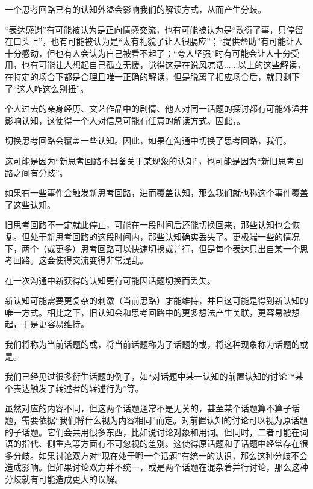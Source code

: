 一个思考回路已有的认知外溢会影响我们的解读方式，从而产生分歧。
\begin{explain}
“表达感谢”有可能被认为是正向情感交流，也有可能被认为是“敷衍了事，只停留在口头上”，也有可能被认为是“太有礼貌了让人很膈应”；“提供帮助”有可能让人十分感动，但也有人会认为自己被看不起了；“夸人坚强”时有可能会让人十分受用，也有可能让人想起自己孤立无援，觉得这是在说风凉话......以上的这些解读，在特定的场合下都是合理且唯一正确的解读，但是脱离了相应场合后，就只剩下了“这人咋这么别扭”。

个人过去的亲身经历、文艺作品中的剧情、他人对同一话题的探讨都有可能外溢并影响认知，这使得一个人对信息可能有任意的解读方式。因此，。
\end{explain}
切换思考回路会覆盖一些认知。因此，如果在沟通中切换了思考回路，我们。
\begin{explain}
这可能是因为“新思考回路不具备关于某现象的认知”，也可能是因为“新旧思考回路之间有分歧”。

如果有一些事件会触发新思考回路，进而覆盖认知，那么我们就也称这个事件覆盖了这些认知。

旧思考回路不一定就此停止，可能在一段时间后还能切换回来，那些认知也会恢复。但处于新思考回路的这段时间内，那些认知确实丢失了。更极端一些的情况下，两个（或更多）思考回路可以快速切换或并行，但是每个表达只出自某一个思考回路。这会使得交流变得非常混乱。
\end{explain}
在一次沟通中新获得的认知更有可能因话题切换而丢失。
\begin{explain}
新认知可能需要更复杂的刺激（当前思路）才能维持，并且这可能是得到新认知的唯一方式。相比之下，旧认知会和思考回路中的更多想法产生关联，更容易被想起，于是更容易维持。
\end{explain}
我们将称为当前话题的或，将当前话题称为子话题的或，将这种现象称为话题的或是。
\begin{explain}
我们已经见过很多衍生话题的例子，如“对话题中某一认知的前置认知的讨论”“某个表达触发了转述者的转述行为”等。

虽然对应的内容不同，但这两个话题通常不是无关的，甚至某个话题算不算子话题，需要依据“我们将什么视为内容相同”而定。对前置认知的讨论可以视为原话题的子话题。它们会共用很多东西，比如说讨论对象和用词。但同时，二者可能在词语的指代、侧重点等方面有不可忽视的差别。这使得原话题和子话题中经常存在很多分歧。如果讨论双方对“现在处于哪一个话题”有统一的认识，那么这种分歧不会造成影响。但如果讨论双方并不统一，或是两个话题在混杂着并行讨论，那么这种分歧就有可能造成更大的误解。
\end{explain}

